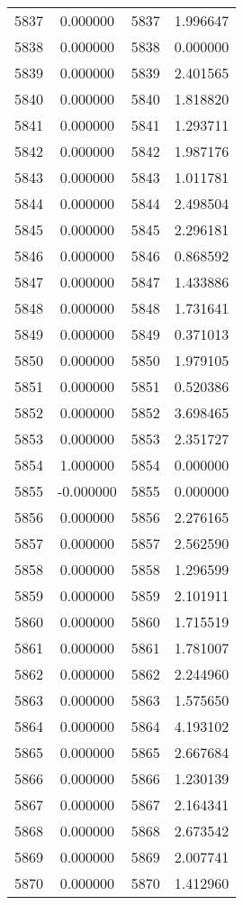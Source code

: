 \documentclass[12pt]{article}
\begin{document}
\begin{longtable}{@{}cccc@{}}
5837 & 0.000000 & 5837 & 1.996647 \\
5838 & 0.000000 & 5838 & 0.000000 \\
5839 & 0.000000 & 5839 & 2.401565 \\
5840 & 0.000000 & 5840 & 1.818820 \\
5841 & 0.000000 & 5841 & 1.293711 \\
5842 & 0.000000 & 5842 & 1.987176 \\
5843 & 0.000000 & 5843 & 1.011781 \\
5844 & 0.000000 & 5844 & 2.498504 \\
5845 & 0.000000 & 5845 & 2.296181 \\
5846 & 0.000000 & 5846 & 0.868592 \\
5847 & 0.000000 & 5847 & 1.433886 \\
5848 & 0.000000 & 5848 & 1.731641 \\
5849 & 0.000000 & 5849 & 0.371013 \\
5850 & 0.000000 & 5850 & 1.979105 \\
5851 & 0.000000 & 5851 & 0.520386 \\
5852 & 0.000000 & 5852 & 3.698465 \\
5853 & 0.000000 & 5853 & 2.351727 \\
5854 & 1.000000 & 5854 & 0.000000 \\
5855 & -0.000000 & 5855 & 0.000000 \\
5856 & 0.000000 & 5856 & 2.276165 \\
5857 & 0.000000 & 5857 & 2.562590 \\
5858 & 0.000000 & 5858 & 1.296599 \\
5859 & 0.000000 & 5859 & 2.101911 \\
5860 & 0.000000 & 5860 & 1.715519 \\
5861 & 0.000000 & 5861 & 1.781007 \\
5862 & 0.000000 & 5862 & 2.244960 \\
5863 & 0.000000 & 5863 & 1.575650 \\
5864 & 0.000000 & 5864 & 4.193102 \\
5865 & 0.000000 & 5865 & 2.667684 \\
5866 & 0.000000 & 5866 & 1.230139 \\
5867 & 0.000000 & 5867 & 2.164341 \\
5868 & 0.000000 & 5868 & 2.673542 \\
5869 & 0.000000 & 5869 & 2.007741 \\
5870 & 0.000000 & 5870 & 1.412960 \\

\end{longtable}
\end{document}
